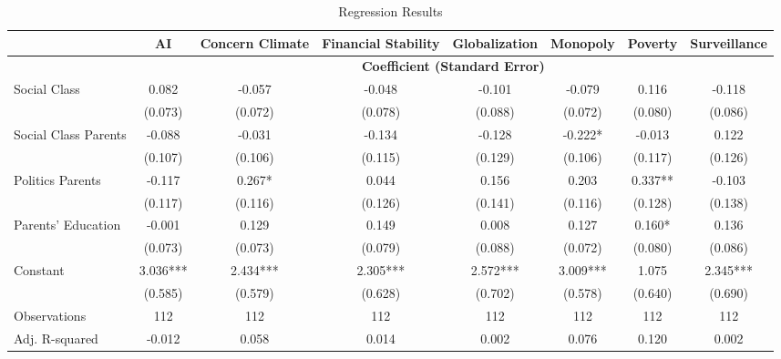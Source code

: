 \documentclass{article}
\begin{document}
\begin{landscape}  %
    \begin{table}[htbp]
        \centering
        \caption{Regression Results}
        \label{tab:reg_results}
        \renewcommand{\arraystretch}{1.5}  %
        \begin{tabular}{lccccccc}
            \hline
            & \textbf{  AI} & \textbf{Concern Climate} & \textbf{  Financial Stability} & \textbf{  Globalization} & \textbf{  Monopoly} & \textbf{  Poverty} & \textbf{  Surveillance} \\
            \hline
            & \multicolumn{7}{c}{\textbf{Coefficient (Standard Error)}} \\
            \hline
            Social Class & 0.082 & -0.057 & -0.048 & -0.101 & -0.079 & 0.116 & -0.118 \\
            & (0.073) & (0.072) & (0.078) & (0.088) & (0.072) & (0.080) & (0.086) \\
            
            Social Class Parents & -0.088 & -0.031 & -0.134 & -0.128 & -0.222* & -0.013 & 0.122 \\
            & (0.107) & (0.106) & (0.115) & (0.129) & (0.106) & (0.117) & (0.126) \\
            
            Politics Parents & -0.117 & 0.267* & 0.044 & 0.156 & 0.203 & 0.337** & -0.103 \\
            & (0.117) & (0.116) & (0.126) & (0.141) & (0.116) & (0.128) & (0.138) \\
            
            Parents' Education & -0.001 & 0.129 & 0.149 & 0.008 & 0.127 & 0.160* & 0.136 \\
            & (0.073) & (0.073) & (0.079) & (0.088) & (0.072) & (0.080) & (0.086) \\
            
            Constant & 3.036*** & 2.434*** & 2.305*** & 2.572*** & 3.009*** & 1.075 & 2.345*** \\
            & (0.585) & (0.579) & (0.628) & (0.702) & (0.578) & (0.640) & (0.690) \\
            \hline
            Observations & 112 & 112 & 112 & 112 & 112 & 112 & 112 \\
            Adj. R-squared & -0.012 & 0.058 & 0.014 & 0.002 & 0.076 & 0.120 & 0.002 \\
            \hline
        \end{tabular}
       
    \end{table}


    
\end{landscape}  %
\end{document}
